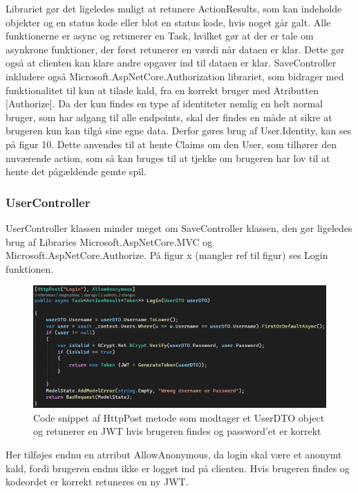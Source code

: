 Librariet gør det ligeledes muligt at retunere ActionResults, som kan indeholde objekter og en status kode eller blot en status kode, hvis noget går galt. Alle funktionerne er async og retunerer en Task, hvilket gør at der er tale om asynkrone funktioner, der først retunerer en værdi når dataen er klar. Dette gør også at clienten kan klare andre opgaver ind til dataen er klar.
SaveController inkludere også Microsoft.AspNetCore.Authorization librariet, som bidrager med funktionalitet til kun at tilade kald, fra en korrekt bruger med Atributten [Authorize]. Da der kun findes en type af identiteter nemlig en helt normal bruger, som har adgang til alle endpoints, skal der findes en måde at sikre at brugeren kun kan tilgå sine egne data. Derfor gøres brug af User.Identity, kan ses på figur 10. Dette anvendes til at hente Claims om den User, som tilhører den nuværende action, som så kan bruges til at tjekke om brugeren har lov til at hente det pågældende gemte spil.\\
    

\subsubsection{UserController}

UserController klassen minder meget om SaveController klassen, den gør ligeledes brug af Libraries Microsoft.AspNetCore.MVC og Microsoft.AspNetCore.Authorize. På figur x (mangler ref til figur) ses Login funktionen.

\begin{figure}[H]
\centering
\includegraphics[width = \textwidth]{02-Body/Images/Backend_Code_Login.PNG}
\caption{Code snippet af HttpPost metode som modtager et UserDTO object og retunerer en JWT hvis brugeren findes og password’et er korrekt}
\label{fig:Arkitektur-Backend-Code-Lgoin}
\end{figure}

Her tilføjes endnu en atrribut AllowAnonymous, da login skal være et anonymt kald, fordi brugeren endnu ikke er logget ind på clienten. Hvis brugeren findes og kodeordet er korrekt retuneres en ny JWT.\\

